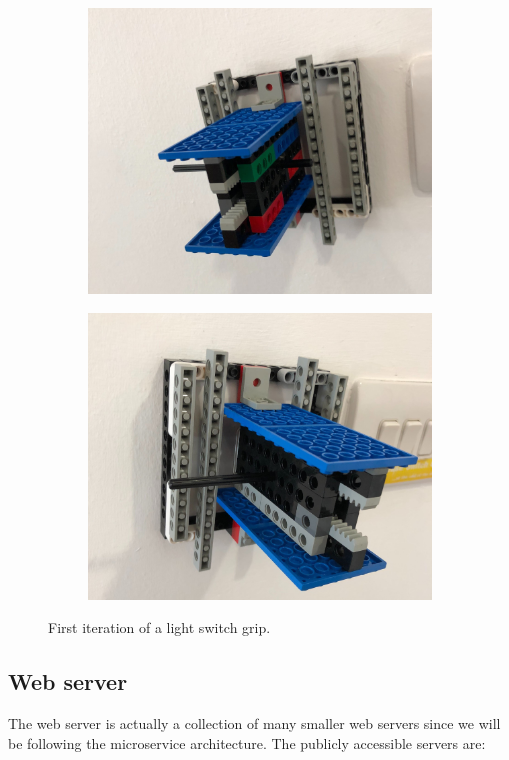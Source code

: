 \documentclass[onecolumn]{IEEEtran}
\begin{document}
\begin{figure}[H]
    \begin{subfigure}{.5\textwidth}
      \centering
      \includegraphics[width=.8\linewidth]{images/light-grip-1.jpg}
    \end{subfigure}
    \begin{subfigure}{.5\textwidth}
      \centering
      \includegraphics[width=.8\linewidth]{images/light-grip-2.jpg}
    \end{subfigure}
    \caption{First iteration of a light switch grip.}
    \label{fig:fig}
\end{figure}

\subsection{Web server}

The web server is actually a collection of many smaller web servers since we will be following the microservice architecture. The publicly accessible servers are:
\end{document}
